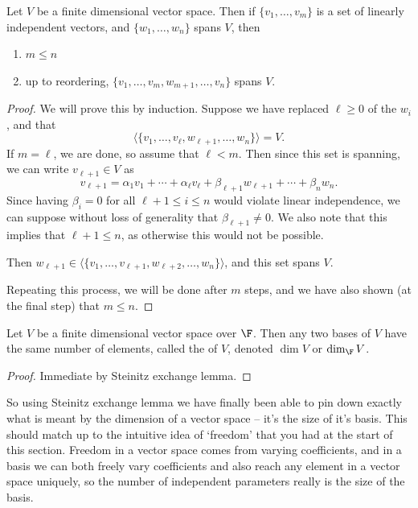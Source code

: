 \documentclass[a4paper]{scrartcl}
\begin{document}
\begin{theorem}
    Let $V$ be a finite dimensional vector space. Then if $\{v_1, \dots, v_m\}$ is a set of linearly independent vectors, and $\{w_1, \dots, w_n\}$ spans $V$, then
    \begin{enumerate}[label=(\roman*)]
        \item $m \leq n$
        \item up to reordering, $\{v_1, \dots, v_m, w_{m + 1}, \dots, v_n\}$ spans $V$.
    \end{enumerate}
\end{theorem}
\begin{proof}
    We will prove this by induction. Suppose we have replaced $\ell \geq 0$ of the $w_i$, and that
    $$
    \langle \{ v_1, \dots, v_\ell, w_{\ell + 1}, \dots, w_n\}\rangle = V.
    $$
    If $m = \ell$, we are done, so assume that $\ell < m$. Then since this set is spanning, we can write $v_{\ell + 1} \in V$ as
    $$
    v_{\ell+1} = \alpha_1 v_1 + \cdots + \alpha_{\ell} v_{\ell} + \beta_{\ell + 1} w_{\ell + 1} + \cdots + \beta_n w_n.
    $$ 
    Since having $\beta_i = 0$ for all $\ell + 1 \leq i \leq n$ would violate linear independence, we can suppose without loss of generality that $\beta_{\ell + 1} \neq 0$. We also note that this implies that $\ell + 1 \leq n$, as otherwise this would not be possible.

    Then $w_{\ell + 1} \in \langle \{v_1, \dots, v_{\ell + 1}, w_{\ell + 2}, \dots, w_{n} \} \rangle$, and this set spans $V$.

    Repeating this process, we will be done after $m$ steps, and we have also shown (at the final step) that $m \leq n$.
\end{proof}

\begin{corollary}[Dimension]
    Let $V$ be a finite dimensional vector space over $\F$. Then any two bases of $V$ have the same number of elements, called the  of $V$, denoted $\dim V$ or $\dim_\F V$.
\end{corollary}
\begin{proof}
    Immediate by Steinitz exchange lemma.
\end{proof}

So using Steinitz exchange lemma we have finally been able to pin down exactly what is meant by the dimension of a vector space -- it's the size of it's basis.
This should match up to the intuitive idea of `freedom' that you had at the start of this section. Freedom in a vector space comes from varying coefficients, and in a basis we can both freely vary coefficients and also reach any element in a vector space uniquely, so the number of independent parameters really is the size of the basis.
\end{document}

